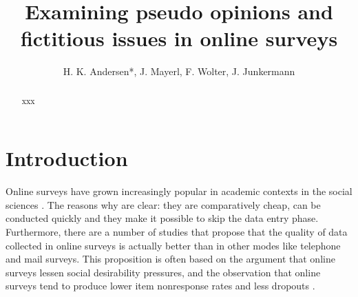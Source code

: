 \documentclass[Royal,times,sageh]{sagej}
\begin{document}
\title{Examining pseudo opinions and fictitious issues in online
surveys}


\author{H. K. Andersen*, J. Mayerl, F.
Wolter, J. Junkermann}




\begin{abstract}
xxx
\end{abstract}


\maketitle

\renewcommand{\thefootnote}{\arabic{footnote}}

\hypertarget{introduction}{%
\section{Introduction}\label{introduction}}

Online surveys have grown increasingly popular in academic contexts in
the social sciences \citep{Bandilla2016, Silber2013}. The reasons why
are clear: they are comparatively cheap, can be conducted quickly and
they make it possible to skip the data entry phase. Furthermore, there
are a number of studies that propose that the quality of data collected
in online surveys is actually better than in other modes like telephone
and mail surveys. This proposition is often based on the argument that
online surveys lessen social desirability pressures, and the observation
that online surveys tend to produce lower item nonresponse rates and
less dropouts \citep{Shin2011}.
\end{document}
